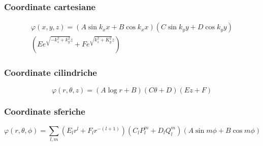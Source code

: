\subsubsection{Coordinate cartesiane}
\begin{multline}
  \varphi(x,y,z)=\left(A\sin k_x x+B\cos k_x x\right)\left(C\sin k_y y+D\cos k_y y\right)\\\left(Ee^{\sqrt{-k_z^2+k_y^2}z}+Fe^{\sqrt{k_z^2+K_y^2}z}\right)
\end{multline}
\subsubsection{Coordinate cilindriche}
\begin{equation}
  \varphi(r,\theta,z)=\left(A\log r+B\right)\left(C\theta+D\right)\left(Ez+F\right)
\end{equation}
\subsubsection{Coordinate sferiche}
\begin{equation}
  \varphi(r,\theta,\phi)=\sum_{l,m}\left(E_lr^l+F_lr^{-(l+1)}\right)\left(C_lP_l^m+D_lQ_l^m\right)\left(A\sin m\phi+B\cos m\phi\right)
\end{equation}
